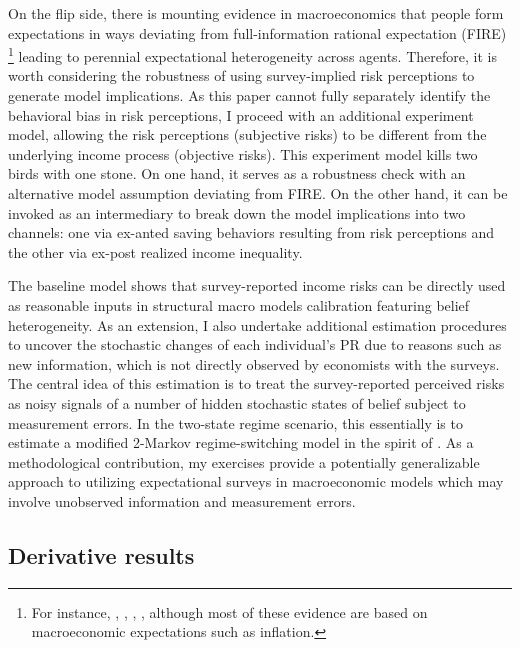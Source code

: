 On the flip side, there is mounting evidence in macroeconomics that people form expectations in ways deviating from full-information rational expectation (FIRE) \footnote{For instance, \cite{mankiw2003disagreement}, \cite{reis2006inattentive}, \cite{coibion2012can}, \cite{wang2021infvar}, although most of these evidence are based on macroeconomic expectations such as inflation.} leading to perennial expectational heterogeneity across agents. Therefore, it is worth considering the robustness of using survey-implied risk perceptions to generate model implications. As this paper cannot fully separately identify the behavioral bias in risk perceptions, I proceed with an additional experiment model, allowing the risk perceptions (subjective risks) to be different from the underlying income process (objective risks). This experiment model kills two birds with one stone. On one hand, it serves as a robustness check with an alternative model assumption deviating from FIRE. On the other hand, it can be invoked as an intermediary to break down the model implications into two channels: one via ex-anted saving behaviors resulting from risk perceptions and the other via ex-post realized income inequality. 

The baseline model shows that survey-reported income risks can be directly used as reasonable inputs in structural macro models calibration featuring belief heterogeneity. As an extension, I also undertake additional estimation procedures to uncover the stochastic changes of each individual's PR due to reasons such as new information, which is not directly observed by economists with the surveys. The central idea of this estimation is to treat the survey-reported perceived risks as noisy signals of a number of hidden stochastic states of belief subject to measurement errors. In the two-state regime scenario, this essentially is to estimate a modified 2-Markov regime-switching model in the spirit of \cite{hamilton1989new}. As a methodological contribution, my exercises provide a potentially generalizable approach to utilizing expectational surveys in macroeconomic models which may involve unobserved information and measurement errors. 

\subsection{Derivative results}

